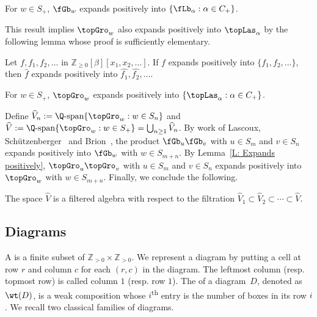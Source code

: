 \begin{ourthm}[\cite{SY}]
\label{T: Gro to Las}
For $w \in S_+$, $\fGb_w$ expands positively
into $\{\fLb_\alpha: \alpha \in C_+\}$. 
\end{ourthm}
 
This result implies
$\topGro_w$ also expands
positively into
$\topLas_\alpha$ by the following lemma whose proof
is sufficiently elementary. 

\begin{lemma}
\label{L: Expands positively}
Let $f, f_1, f_2, \dots$ 
in $\mathbb{Z}_{\geq 0}[\beta][x_1, x_2,\dots]$.
If $f$ expands positively 
into $\{f_1, f_2, \dots\}$,
then $\widehat{f}$ expands positively into $\widehat{f_1}, \widehat{f_2}, \dots $.
\end{lemma}

\begin{cor}
\label{C: top Gro to top Las}
For $w \in S_+$,
$\topGro_w$ expands positively into $\{\topLas_\alpha: \alpha \in C_+\}$.
\end{cor}

Define $\widehat{V}_n :=  \Q\textrm{-span}\{\topGro_w: w \in S_n\}$ and $\widehat{V} :=  \Q\textrm{-span}\{\topGro_w: w \in S_+\} = \bigcup_{n \geq 1} \widehat{V}_n$.
By work of Lascoux, Sch{\"u}tzenberger~\cite{LS:Groth} and Brion~\cite{Bri},
the product $\fGb_u \fGb_v$ with $u \in S_m$ and $v \in S_n$
expands positively into $\fGb_w$ with $w \in S_{m + n}$.
By Lemma~\ref{L: Expands positively},
$\topGro_u \topGro_v$ with $u \in S_m$ and $v \in S_n$ expands positively into $\topGro_w$ 
with $w \in S_{m + n}$.
Finally, we conclude the following.
\begin{prop}
\label{P: Filtered Algebra}
The space $\widehat{V}$ is a filtered 
algebra with respect to the filtration
$\widehat{V}_1 \subset \widehat{V}_2 \subset \cdots \subset \widehat{V}$.
\end{prop}


\subsection{Diagrams}\label{subsec.diagrams}
A  is a finite subset 
of $\mathbb{Z}_{>0} \times \mathbb{Z}_{>0}$.
We represent a diagram by putting a cell at row $r$
and column $c$ for each $(r,c)$ in the diagram.
The leftmost column (resp. topmost row) is called column $1$ (resp. row $1$).
The  of a diagram~$D$, 
denoted as $\wt(D)$, 
is a weak composition 
whose $i$\textsuperscript{th}  entry is the number of boxes 
in its row $i$.
We recall two classical families of diagrams. 


